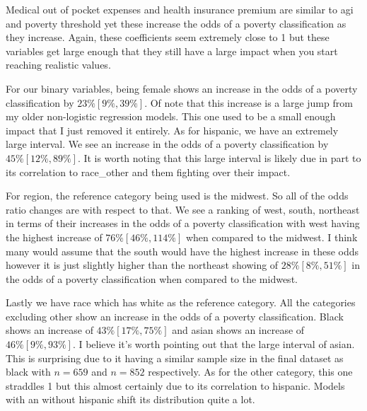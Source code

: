 Medical out of pocket expenses and health insurance premium are similar to agi and poverty threshold yet these increase the odds of a poverty classification as they increase. Again, these coefficients seem extremely close to 1 but these variables get large enough that they still have a large impact when you start reaching realistic values. 

For our binary variables, being female shows an increase in the odds of a poverty classification by $23\%[9\%, 39\%]$. Of note that this increase is a large jump from my older non-logistic regression models. This one used to be a small enough impact that I just removed it entirely. As for hispanic, we have an extremely large interval. We see an increase in the odds of a poverty classification by $45\%[12\%, 89\%]$. It is worth noting that this large interval is likely due in part to its correlation to race\_other and them fighting over their impact. 

For region, the reference category being used is the midwest. So all of the odds ratio changes are with respect to that. We see a ranking of west, south, northeast in terms of their increases in the odds of a poverty classification with west having the highest increase of $76\%[46\%, 114\%]$ when compared to the midwest. I think many would assume that the south would have the highest increase in these odds however it is just slightly higher than the northeast showing of $28\%[8\%, 51\%]$ in the odds of a poverty classification when compared to the midwest.

Lastly we have race which has white as the reference category. All the categories excluding other show an increase in the odds of a poverty classification. Black shows an increase of $43\%[17\%, 75\%]$ and asian shows an increase of $46\%[9\%, 93\%]$. I believe it's worth pointing out that the large interval of asian. This is surprising due to it having a similar sample size in the final dataset as black with $n=659$ and $n=852$ respectively. As for the other category, this one straddles 1 but this almost certainly due to its correlation to hispanic. Models with an without hispanic shift its distribution quite a lot. 